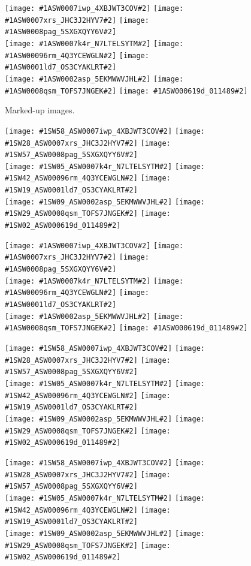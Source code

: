 \def\pwidth{.32\linewidth}

\def\includeten#1#2{
\texttt{[image: \#1ASW0007iwp\_4XBJWT3COV\#2]}%
\texttt{[image: \#1ASW0007xrs\_JHC3J2HYV7\#2]}%
\texttt{[image: \#1ASW0008pag\_5SXGXQYY6V\#2]}\\
\texttt{[image: \#1ASW0007k4r\_N7LTELSYTM\#2]}%
\texttt{[image: \#1ASW00096rm\_4Q3YCEWGLN\#2]}%
\texttt{[image: \#1ASW0001ld7\_OS3CYAKLRT\#2]}\\
\texttt{[image: \#1ASW0002asp\_5EKMWWVJHL\#2]}%
\texttt{[image: \#1ASW0008qsm\_TOFS7JNGEK\#2]}%
\texttt{[image: \#1ASW000619d\_011489\#2]}\\
}

\def\includezehn#1#2{
\texttt{[image: \#1SW58\_ASW0007iwp\_4XBJWT3COV\#2]}%
\texttt{[image: \#1SW28\_ASW0007xrs\_JHC3J2HYV7\#2]}%
\texttt{[image: \#1SW57\_ASW0008pag\_5SXGXQYY6V\#2]}\\%
\texttt{[image: \#1SW05\_ASW0007k4r\_N7LTELSYTM\#2]}%
\texttt{[image: \#1SW42\_ASW00096rm\_4Q3YCEWGLN\#2]}%
\texttt{[image: \#1SW19\_ASW0001ld7\_OS3CYAKLRT\#2]}\\%
\texttt{[image: \#1SW09\_ASW0002asp\_5EKMWWVJHL\#2]}%
\texttt{[image: \#1SW29\_ASW0008qsm\_TOFS7JNGEK\#2]}%
\texttt{[image: \#1SW02\_ASW000619d\_011489\#2]}\\%
}

\begin{figure}
\includeten{spaghetti/}{_input}
\caption{Marked-up images. \label{fig:markedup}}
\end{figure}

\begin{figure}
\includezehn{img/arrival_spaghetti/}{_arrival_spaghetti}
\caption{\label{fig:arriv}}
\end{figure}

\begin{figure}
\includeten{img/nsynth/}{_nsynth}
\label{fig:synth}
\caption{}
\end{figure}

\begin{figure}
\includezehn{img/kappa_map/}{_kappa_map}
\caption{\label{fig:kappa}}
\end{figure}

\begin{figure}
\includezehn{img/kappa_encl/}{_kappa_encl}
\caption{}
\end{figure}

